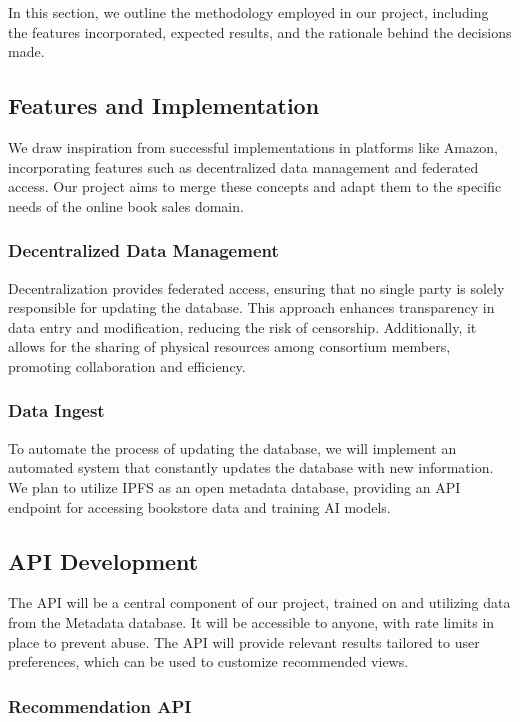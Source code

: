 \documentclass{article}
\begin{document}
In this section, we outline the methodology employed in our project, including the features incorporated, expected results, and the rationale behind the decisions made.

\subsection{Features and Implementation}

We draw inspiration from successful implementations in platforms like Amazon, incorporating features such as decentralized data management and federated access. Our project aims to merge these concepts and adapt them to the specific needs of the online book sales domain.

\subsubsection{Decentralized Data Management}

Decentralization provides federated access, ensuring that no single party is solely responsible for updating the database. This approach enhances transparency in data entry and modification, reducing the risk of censorship. Additionally, it allows for the sharing of physical resources among consortium members, promoting collaboration and efficiency.

\subsubsection{Data Ingest}

To automate the process of updating the database, we will implement an automated system that constantly updates the database with new information. We plan to utilize IPFS as an open metadata database, providing an API endpoint for accessing bookstore data and training AI models.

\subsection{API Development}

The API will be a central component of our project, trained on and utilizing data from the Metadata database. It will be accessible to anyone, with rate limits in place to prevent abuse. The API will provide relevant results tailored to user preferences, which can be used to customize recommended views.

\subsubsection{Recommendation API}
\end{document}
